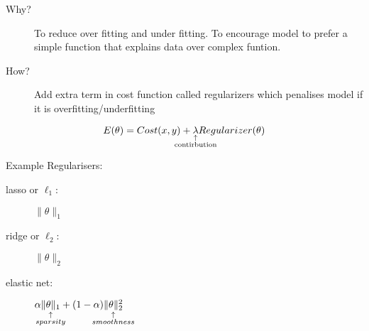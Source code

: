 \begin{slide}[Regularization]
  \begin{description}
     \item[Why?] To reduce over fitting and under fitting. To encourage model to prefer a simple function that explains data over complex funtion.
   \item[How?] Add extra term in cost function called regularizers which penalises model if it is overfitting/underfitting
  \end{description}
 $$  E(\theta) = Cost(x,y) + \explain{\lambda}{\text{contirbution}} Regularizer(\theta)$$

  Example Regularisers:
  \begin{description}
    \item[lasso or $\ell_1$:] $\|\theta\|_1$
    \item[ridge or $\ell_2$:] $\|\theta\|_2$
    \item[elastic net:] $\alpha\explain{\|\theta\|_1}{sparsity} +(1-\alpha)\explain{\|\theta\|_2^2}{smoothness}$

  \end{description}


\end{slide}
